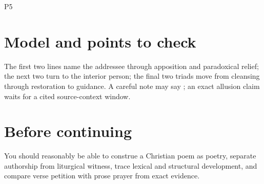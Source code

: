 \begin{courseunit}{P5}
\ifsolutions
\section{Model and points to check}
The first two lines name the addressee through apposition and paradoxical
relief; the next two turn to the interior person; the final two triads move
from cleansing through restoration to guidance. A careful note may say
; an exact allusion claim waits
for a cited source-context window.
\else
\section{Before continuing}
You should reasonably be able to construe a Christian poem as poetry, separate
authorship from liturgical witness, trace lexical and structural development,
and compare verse petition with prose prayer from exact evidence.
\fi
\end{courseunit}

